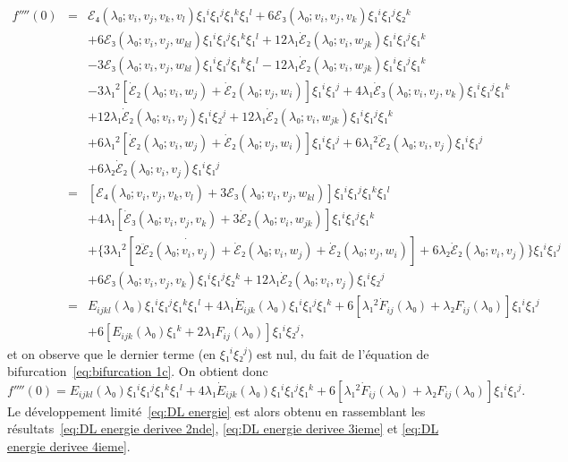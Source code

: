 \documentclass{article}
\begin{document}
\begin{eqnarray*}
  f'''' (0) & = & ℰ₄ (λ₀ ; v_i, v_j, v_k {, v_l} ) ξ₁^i
  ξ₁^j ξ₁^k ξ₁^l + 6ℰ₃ (λ₀ ; v_i, v_j, v_k) ξ₁^i
  ξ₁^j ξ₂^k\\
  &  &  + 6ℰ₃ (λ₀ ; v_i, v_j, w_{k  l})
  ξ₁^i ξ₁^j ξ₁^k ξ₁^l + 12 λ₁  \dot{ℰ}₂
  (λ₀ ; v_{i }, w_{j  k}) ξ₁^i ξ₁^j ξ₁^k\\
  &  &  - 3ℰ₃ (λ₀ ; v_i, v_j, w_{k  l})
  ξ₁^i ξ₁^j ξ₁^k ξ₁^l - 12 λ₁  \dot{ℰ}₂
  (λ₀ ; v_i, w_{j  k}) ξ₁^i ξ₁^j ξ₁^k\\
  &  &  - 3 λ₁^2  [\dot{ℰ}₂ (λ₀ ; v_i, w_j)
  + \dot{ℰ}₂ (λ₀ ; v_j, w_i)] ξ₁^i ξ₁^j + 4 λ₁
  \dot{ℰ}₃ (λ₀ ; v_i, v_j, v_k) ξ₁^i ξ₁^j ξ₁^k\\
  &  &  + 12 λ₁  \dot{ℰ}₂ (λ₀ ; v_i,
  v_j) ξ₁^i ξ₂^j + 12 λ₁  \dot{ℰ}₂ (λ₀ ;
  v_i, w_{j  k}) ξ₁^i ξ₁^j ξ₁^k\\
  &  &  + 6 λ₁^2  [\dot{ℰ}₂ (λ₀ ; v_i,
  w_j) + \dot{ℰ}₂ (λ₀ ; v_j, w_i)] ξ₁^i ξ₁^j + 6
  λ₁^2  \ddot{ℰ}₂ (λ₀ ; v_i, v_j) ξ₁^i ξ₁^j\\
  &  &  + 6 λ₂  \dot{ℰ}₂ (λ₀ ; v_i, v_j)
  ξ₁^i ξ₁^j\\
  & = & \left[ ℰ₄ (λ₀ ; v_i, v_j, v_k {, v_l} ) +
  3ℰ₃ (λ₀ ; v_i, v_j, w_{k  l}) \right] ξ₁^i
  ξ₁^j ξ₁^k ξ₁^l\\
  &  &  + 4 λ₁  [\dot{ℰ}₃ (λ₀ ; v_i, v_j,
  v_k) + 3 \dot{ℰ}₂ (λ₀ ; v_i, w_{j  k})] ξ₁^i
  ξ₁^j ξ₁^k\\
  &  &  + \{ 3 λ₁^2  [\dot{2 \ddot{ℰ}₂
  (λ₀ ; v_i, v_j) + \dot{ℰ}}₂ (λ₀ ; v_i, w_j) +
  \dot{ℰ}₂ (λ₀ ; v_j, w_i)] + 6 λ₂
  \dot{ℰ}₂ (λ₀ ; v_i, v_j) \} ξ₁^i ξ₁^j\\
  &  &  + 6ℰ₃ (λ₀ ; v_i, v_j, v_k) ξ₁^i ξ₁^j
  ξ₂^k + 12 λ₁  \dot{ℰ}₂ (λ₀ ; v_i, v_j)
  ξ₁^i ξ₂^j\\
  & = & E_{i  j  k  l} (λ₀) ξ₁^i ξ₁^j
  ξ₁^k ξ₁^l + 4 λ₁  \dot{E}_{i  j  k}
  (λ₀) ξ₁^i ξ₁^j ξ₁^k + 6 [λ₁^2  \dot{F}_{i
   j} (λ₀) + λ₂ F_{i  j} (λ₀)]
  ξ₁^i ξ₁^j\\
  &  &  + 6 [E_{i  j  k} (λ₀) ξ₁^k + 2
  λ₁ F_{i  j} (λ₀)] ξ₁^i ξ₂^j,
\end{eqnarray*}
et on observe que le dernier terme (en $ξ₁^i ξ₂^j$) est nul, du fait de
l'équation de bifurcation~\eqref{eq:bifurcation 1c}. On obtient donc
\begin{equation}
  \label{eq:DL energie derivee 4ieme} f'''' (0) = E_{i  j  k
   l} (λ₀) ξ₁^i ξ₁^j ξ₁^k ξ₁^l + 4 λ₁
  \dot{E}_{i  j  k} (λ₀) ξ₁^i ξ₁^j ξ₁^k + 6
  [λ₁^2  \dot{F}_{i  j} (λ₀) + λ₂ F_{i
   j} (λ₀)] ξ₁^i ξ₁^j .
\end{equation}
Le développement limité~\eqref{eq:DL energie} est alors obtenu en
rassemblant les résultats~\eqref{eq:DL energie derivee 2nde}, \eqref{eq:DL
energie derivee 3ieme} et \eqref{eq:DL energie derivee 4ieme}.
\end{document}
